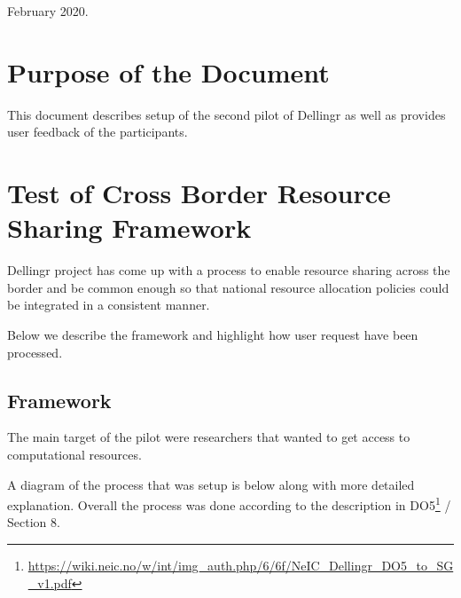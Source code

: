 \documentclass{article}
\begin{document}
February 2020.

\section{Purpose of the Document}

This document describes setup of the second pilot of Dellingr as well as provides user feedback of the participants.

\section{Test of Cross Border Resource Sharing Framework}

Dellingr project has come up with a process to enable resource sharing across the border and be common enough so that national resource allocation policies could be integrated in a consistent manner.

Below we describe the framework and highlight how user request have been processed.

\subsection{Framework}

The main target of the pilot were researchers that wanted to get access to computational resources.

A diagram of the process that was setup is below along with more detailed explanation. Overall the process was done according to the description in DO5\footnote{\url{https://wiki.neic.no/w/int/img_auth.php/6/6f/NeIC_Dellingr_DO5_to_SG_v1.pdf}} / Section 8.
\end{document}
